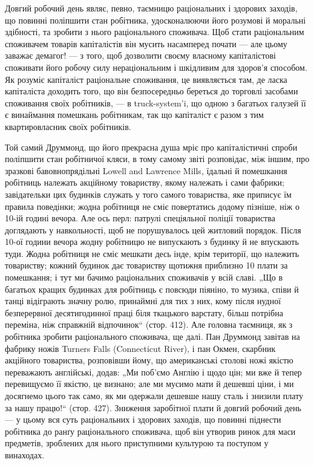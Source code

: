 Довгий робочий день являє, певно, таємницю раціональних і здорових
заходів, що повинні поліпшити стан робітника, удосконалюючи його розумові
й моральні здібності, та зробити з нього раціонального споживача.
Щоб стати раціональним споживачем товарів капіталістів він мусить
насамперед почати — але цьому заважає демагог! — з того, щоб дозволити
своєму власному капіталістові споживати його робочу силу
нераціональним і шкідливим для здоров’я способом. Як розуміє
капіталіст раціональне споживання, це виявляється там, де ласка капіталіста
доходить того, що він безпосередньо береться до торговлі
засобами споживання своїх робітників, — в truck-system’i, що одною з
багатьох галузей її є винаймання помешкань робітникам, так що капіталіст
є разом з тим квартировласник своїх робітників.

Той самий Друммонд, що його прекрасна душа мріє про капіталістичні
спроби поліпшити стан робітничої кляси, в тому самому звіті розповідає,
між іншим, про зразкові бавовнопрядільні Lowell and Lawrence Mills,
їдальні й помешкання робітниць належать акційному товариству, якому
належать і сами фабрики; завідательки цих будинків служать у того
самого товариства, яке приписує їм правила поведінки; жодна робітниця
не сміє повертатись додому пізніше, ніж о 10-ій годині вечора. Але
ось перл: патрулі спеціяльної поліції товариства доглядають у навкольності,
щоб не порушувалось цей житловий порядок. Після 10-ої години
вечора жодну робітницю не випускають з будинку й не впускають туди.
Жодна робітниця не сміє мешкати десь інде, крім території, що належить
товариству; кожний будинок дає товариству щотижня приблизно 10
плати за помешкання; і тут ми бачимо раціональних споживачів у всій
славі. „Що в багатьох кращих будинках для робітниць є повсюди піяніно,
то музика, співи й танці відіграють значну ролю, принаймні для тих з
них, кому після нудної безперервної десятигодинної праці біля ткацького
варстату, більш потрібна переміна, ніж справжній відпочинок“ (стор. 412).
Але головна таємниця, як з робітника зробити раціонального споживача,
ще далі. Пан Друммонд завітав на фабрику ножів Turners Falls (Connecticut
River), і пан Окмен, скарбник акційного товариства, розповівши
йому, що американські столові ножі якістю переважають англійські, додав:
„Ми поб’ємо Англію і щодо цін; ми вже й тепер перевищуємо її якістю,
це визнано; але ми мусимо мати й дешевші ціни, і ми досягнемо цього
так само, як ми одержали дешевше нашу сталь і знизили плату за нашу
працю!“ (стор. 427). Зниження заробітної плати й довгий робочий день —
у цьому вся суть раціональних і здорових заходів, що повинні піднести
робітника до ранґу раціонального споживача, щоб він утворив ринок
для маси предметів, зроблених для нього приступними культурою та поступом
у винаходах.

